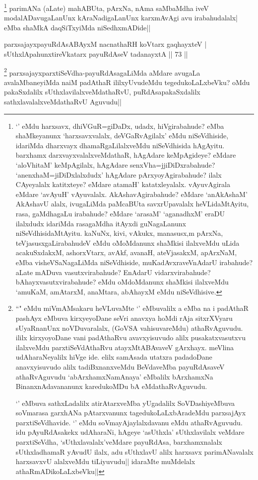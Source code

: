 \begin{artha}
\footnote[1]{`\stext ' eMdu harxsavx, dhiVGuR=giDaDx, udadx, hiVgirabahude? eMba shaMkeyanunx `harxsavxvalalx, deVGaRvAgilalx' eMdu niSeVdhiside, idariMda dharxvayx dhamaRgaLilalxveMdu niSeVdhisida hAgAyitu. barxhamx darxvayxvalalxveMdathaR, hAgAdare keMpAgideye? eMdare `aloVhitaM' keMpAgilalx, hAgAdare senxVha=jjiDiDxrabahude? `anenxhaM=jiDiDxlalxdudx' hAgAdare pArxyoyAgirabahude? ilalx CAyeyalalx katitxteye? eMdare atamaH' katatxleyalalx. vAyuvAgirala eMdare `avAyuH' vAyuvalalx. AkAshavAgirabahude? eMdare `anAkAshaM' AkAshavU alalx, ivugaLiMda paMcaBUta savxrUpavalalx heVLidaMtAyitu, rasa, gaMdhagaLu irabahude? eMdare `arasaM' `aganadhxM' eraDU ilalxdudx idariMda rasagaMdha itAyxdi guNagaLanunx niSeVdhisidaMtAyitu. kaNuNx, kivi, vAkukx, manasusx,m pArxNa, teVjasusxgaLirabahudeV eMdu oMoMdanunx shaMkisi ilalxveMdu uLida acakuSxdakxM, ashorxVtarx, avAkf, avanaH, ateVjasakxM, apArxNaM, eMba visheVSaNagaLiMda niSeVdhiside, muKadAvxraveVnAdarU irabahude? aLate mADuva vasutxvirabahude? EnAdarU vidarxvirabahude? bAhayxvasutxvirabahude? eMdu oMdoMdanunx shaMkisi ilalxveMdu `amuKaM, amAtarxM, anaMtara, abAhayxM eMdu niSeVdhisive.} parimANa (aLate) mahABUta, pArxNa, nAma saMbaMdha iveV modalADavugaLanUnx kAraNadigaLanUnx karxmAvAgi avu irabahudalalx| eMba shaMkA daqSiTxyiMda niSedhxmADide||
\end{artha}


\begin{shl}
parxsajayxpayuRdAsABAyxM nacnathaRH koV\s tarx gaqhayxteV |\\
sUthxlApahunxtireVkatarx payuRdAseV tadanayxtA \hfill || 73 ||
\end{shl}

\begin{artha}
\footnote[1]{``\stext " eMdu miVmAMsakaru heVLuvaMte `\stext' eMbuvalilx a eMba na i padAthaR pashAyx eMbuva kirxyeyoDane seVri anavxya hoMdi rAja sitxrXVyaru sUyaRnanUnx noVDuvaralalx, (GoVSA vahisuvareMdu) athaRvAguvudu. ililx kirxyoyoDane vani padAthaRvu avavxyisuvudo alilx pusakatxvasutxvu ilalxveMdu parxtiSeVdAthaRvu atayxMtABAvaveV gArxhayx. meVlina udAharaNeyalilx hiVge ide. elilx samAsada utatxra padadoDane anavxyisuvudo alilx tadiBxnanxveMdu BeVdaveMba payuRdAsaveV athaRvAguvudu `abArxhamxNamAnaya' eMbalilx bArxhamxNa BinanxnAdavananunx karedukoMDu bA eMdathaRvAguvudu. 

`\stext ' eMbuva sathxLadalilx atirAtarxveMba yUgadalilx SoVDashiyeMbuva soVmarasa garxhANa pAtarxvanunx tagedukoLaLxbAradeMdu parxsajAyx parxtiSeVdhavide. `\stext ' eMdu soVmayAjaylalxdavanu eMdu athaRvAguvudu. idu pAyuRdAsakekx udAharaNi, hAgeye `asUthxla' sUthxlavilalx veMdare parxtiSeVdha, `sUthxlavalalx'veMdare payuRdAsa, barxhamxnalalx sUthxladhamaR yAvudU ilalx, adu sUthxlavU alilx harxsavx parimANavalalx harxsavxvU alalxveMdu tiLiyuvudu|| idaraMte muMdelalx athaRmADikoLaLxbeVku||} parxsajayxparxtiSeVdha-payuRdAsagaLiMda aMdare avugaLa avalaMbaneyiMda naiM padAthaR ililxyUvudeMdu tegedukoLaLxbeVku? oMdu pakaSxdalilx sUthxlavilalxveMdathaRvU, puRdAsapakaSxdalilx sathxlavalalxveMdathaRvU Aguvudu||
\end{artha}

